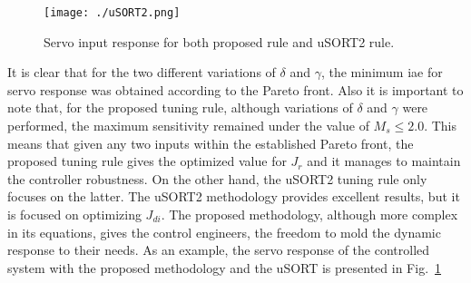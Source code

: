 \begin{figure}
	\centering
	\texttt{[image: ./uSORT2.png]}
	\caption{Servo input response for both proposed rule and uSORT2 rule.}
	\label{F:uSort}
\end{figure}
It is clear that for the two different variations of $\delta$ and $\gamma$, the minimum \gls{iae} for servo response was obtained according to the Pareto front. Also it is important to note that, for the proposed tuning rule, although variations of $\delta$ and $\gamma$ were performed, the maximum sensitivity remained under the value of $M_s \leq 2.0$. This means that given any two inputs within the established Pareto front, the proposed tuning rule gives the optimized value for $J_r$ and it manages to maintain the controller robustness. On the other hand, the uSORT2 tuning rule only focuses on the latter. %
The uSORT2 methodology provides excellent results, but it is focused on optimizing $J_{di}$. The proposed methodology, although more complex in its equations, gives the control engineers, the freedom to mold the dynamic response to their needs. As an example, the servo response of the controlled system with the proposed methodology and the uSORT is presented in Fig.~\ref{F:uSort}